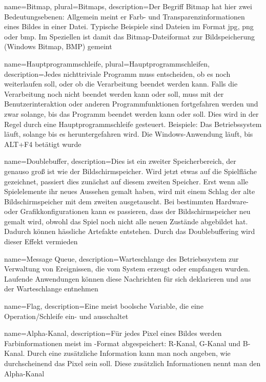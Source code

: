 {
  name={Bitmap},
  plural={Bitmaps},
  description={Der Begriff Bitmap hat hier zwei Bedeutungsebenen: Allgemein meint er Farb- und Transparenzinformationen eines Bildes in einer Datei. Typische Beispiele sind Dateien im Format \Gls{jpg}, \Gls{png} oder \Gls{bmp}. Im Speziellen ist damit das Bitmap-Dateiformat zur Bildspeicherung (Windows Bitmap, BMP) gemeint} 
}

{
  name={Hauptprogrammschleife},
  plural={Hauptprogrammschleifen},
  description={Jedes nichttriviale Programm muss entscheiden, ob es noch weiterlaufen soll, oder ob die Verarbeitung beendet werden kann. Falls die Verarbeitung noch nicht beendet werden kann oder soll, muss mit der Benutzerinteraktion oder anderen Programmfunktionen fortgefahren werden und zwar solange, bis das Programm beendet werden kann oder soll. Dies wird in der Regel durch eine Hauptprogrammschleife gesteuert. Beispiele: Das Betriebssystem läuft, solange bis es heruntergefahren wird. Die Windows-Anwendung läuft, bis ALT+F4 betätigt wurde} 
}

{
  name={Doublebuffer},
  description={Dies ist ein zweiter Speicherbereich, der genauso groß ist wie der Bildschirmspeicher. Wird jetzt etwas auf die Spielfläche gezeichnet, passiert dies zunächst auf diesem zweiten Speicher. Erst wenn alle Spielelemente ihr neues Aussehen gemalt haben, wird mit einem Schlag der alte Bildschirmspeicher mit dem zweiten ausgetauscht. Bei bestimmten Hardware- oder Grafikkonfigurationen kann es passieren, dass der Bildschirmspeicher neu gemalt wird, obwohl das Spiel noch nicht alle neuen Zustände abgebildet hat. Dadurch können hässliche Artefakte entstehen. Durch das Doublebuffering wird dieser Effekt vermieden} 
}

{
  name={Message Queue},
  description={Warteschlange des Betriebssystem zur Verwaltung von Ereignissen, die vom System erzeugt oder empfangen wurden. Laufende Anwendungen können diese Nachrichten für sich deklarieren und aus der Warteschlange entnehmen} 
}

{
  name={Flag},
  description={Eine meist boolsche Variable, die eine Operation/Schleife ein- und ausschaltet} 
}

{
  name={Alpha-Kanal},
  description={Für jedes Pixel eines Bildes werden Farbinformationen meist im -Format abgespeichert: R-Kanal, G-Kanal und B-Kanal. Durch eine zusätzliche Information kann man noch angeben, wie durchscheinend das Pixel sein soll. Diese zusätzlich Informationen nennt man den Alpha-Kanal} 
}

